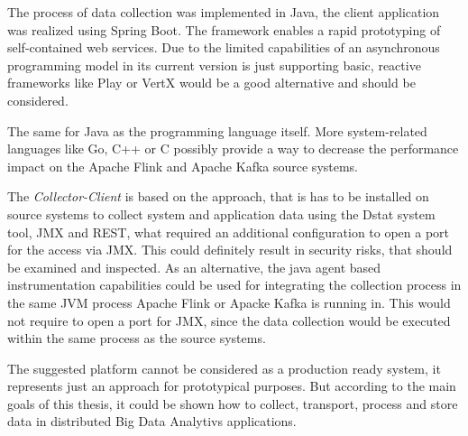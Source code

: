 The process of data collection was implemented in Java, the client application was realized using Spring Boot. The framework
enables a rapid prototyping of self-contained web services. Due to the limited capabilities of an asynchronous programming model in its current version is just supporting basic,
reactive frameworks like Play or VertX would be a good alternative and should be considered.

The same for Java as the programming language itself. More system-related languages like Go, C++ or C possibly provide a way to
decrease the performance impact on the Apache Flink and Apache Kafka source systems.

The \textit{Collector-Client} is based on the approach, that is has to be installed on source systems to collect system and application data using the Dstat system tool,
JMX and REST, what required an additional configuration to open a port for the access via JMX. This could
definitely result in security risks, that should be examined and inspected. As an alternative, the java agent based instrumentation capabilities
could be used for integrating the collection process in the same JVM process Apache Flink or Apacke Kafka is running in. This would not
require to open a port for JMX, since the data collection would be executed within the same process as the source systems.

The suggested platform cannot be considered as a production ready system, it represents just an approach for prototypical purposes.
But according to the main goals of this thesis, it could be shown how to collect, transport, process and store data in distributed
Big Data Analytivs applications.
